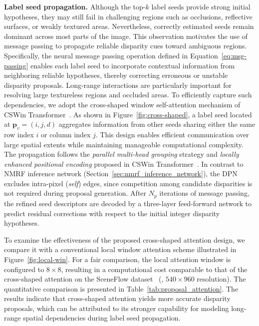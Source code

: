 \noindent\textbf{Label seed propagation.}
Although the top-$k$ label seeds provide strong initial hypotheses, they may still fail in challenging regions such as occlusions, reflective surfaces, or weakly textured areas. 
Nevertheless, correctly estimated seeds remain dominant across most parts of the image. 
This observation motivates the use of message passing to propagate reliable disparity cues toward ambiguous regions. 
Specifically, the neural message passing operation defined in Equation~\ref{eq:msg-passing} enables each label seed to incorporate contextual information from neighboring reliable hypotheses, thereby correcting erroneous or unstable disparity proposals.
Long-range interactions are particularly important for resolving large textureless regions and occluded areas. 
To efficiently capture such dependencies, we adopt the cross-shaped window self-attention mechanism of CSWin Transformer~\cite{dong2022cswin}. 
As shown in Figure~\ref{fig:cross-shaped}, a label seed located at $\mathbf{p}_v=(i,j,d)$ aggregates information from other seeds sharing either the same row index $i$ or column index $j$. 
This design enables efficient communication over large spatial extents while maintaining manageable computational complexity.
The propagation follows the \emph{parallel multi-head grouping} strategy and \emph{locally enhanced positional encoding} proposed in CSWin Transformer~\cite{dong2022cswin}.
In contrast to NMRF inference network (Section~\ref{sec:nmrf_inference_network}), the DPN excludes intra-pixel (\emph{self}) edges, since competition among candidate disparities is not required during proposal generation.
After $N_p$ iterations of message passing, the refined seed descriptors are decoded by a three-layer feed-forward network to predict residual corrections with respect to the initial integer disparity hypotheses.

To examine the effectiveness of the proposed cross-shaped attention design, we compare it with a conventional local window attention scheme illustrated in Figure~\ref{fig:local-win}.
For a fair comparison, the local attention window is configured to $8 \times 8$, resulting in a computational cost comparable to that of the cross-shaped attention on the SceneFlow dataset~\cite{mayer2016large} (\ie, $540\times 960$ resolution).
The quantitative comparison is presented in Table~\ref{tab:proposal_attention}.
The results indicate that cross-shaped attention yields more accurate disparity proposals, which can be attributed to its stronger capability for modeling long-range spatial dependencies during label seed propagation.


